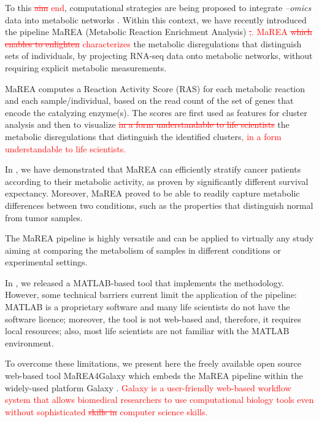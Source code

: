 \documentclass[preprint,12pt,authoryear]{elsarticle}
\newcommand{\red}{\textcolor{red}}
\newcommand{\mareagalaxy}{\textsf{MaREA4Galaxy}}
\newcommand{\mareaTool}{\textsf{MaREA}}
\begin{document}
To this \red{\sout{aim} end}, computational strategies are being
proposed to integrate \textit{--omics} data into metabolic networks
\citep{machado2014systematic,yizhak2015modeling,opdam2017systematic}. Within
this context, we have recently introduced the pipeline
\mareaTool{} %
(Metabolic Reaction Enrichment Analysis) \citep{marea}
%
\red{\sout{,}. \mareaTool{} \sout{which enables to enlighten}
  characterizes} the metabolic disregulations that distinguish sets of
individuals, by projecting RNA-seq data onto metabolic networks,
without requiring explicit metabolic measurements.

\mareaTool{} computes a Reaction Activity Score (RAS) for each
metabolic reaction and each sample/individual, based on the read count
of the set of genes that encode the catalyzing enzyme(s).
%
The scores are first used as features for cluster analysis and then to
visualize \red{\sout{in a form understandable to life scientists}} the
metabolic disregulations that distinguish the identified
clusters\red{, in a form understandable to life scientists.}

In \citep{marea}, we have demonstrated that \mareaTool{} can
efficiently stratify cancer patients according to their metabolic
activity, as proven by significantly different survival expectancy.
%
Moreover, \mareaTool{} proved to be able to readily capture
metabolic differences between two conditions, such as the properties
that distinguish normal from tumor samples. %

The \mareaTool{} pipeline is highly versatile and can be applied to
virtually any study aiming at comparing the metabolism of samples in
different conditions or experimental settings.

In \citep{marea}, we released a MATLAB-based tool that implements the
methodology. However, some technical barriers current limit the
application of the pipeline: MATLAB is a proprietary software and many
life scientists do not have the software licence; moreover, the tool
is not web-based and, therefore, it requires local resources; also,
most life scientists are not familiar with the MATLAB environment.

To overcome these limitations, we present here the freely available
open source web-based tool \mareagalaxy{} which embeds the
\mareaTool{} pipeline within the widely-used platform Galaxy
\citep{galaxy}.
%
\textcolor{red}{Galaxy is a user-friendly web-based workflow system
  that allows biomedical researchers to use computational biology
  tools even without sophisticated \sout{skills in} computer science skills.}
\end{document}
